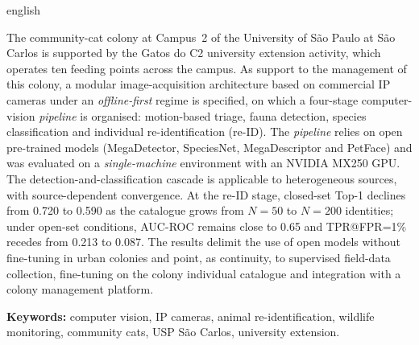 \begin{otherlanguage*}{english}
\renewcommand{\resumoname}{ABSTRACT}
\begin{resumoumacoluna}
The community-cat colony at Campus~2 of the University of São Paulo at São Carlos is supported by the Gatos do C2 university extension activity, which operates ten feeding points across the campus. As support to the management of this colony, a modular image-acquisition architecture based on commercial IP cameras under an \textit{offline-first} regime is specified, on which a four-stage computer-vision \textit{pipeline} is organised: motion-based triage, fauna detection, species classification and individual re-identification (re-ID). The \textit{pipeline} relies on open pre-trained models (MegaDetector, SpeciesNet, MegaDescriptor and PetFace) and was evaluated on a \textit{single-machine} environment with an NVIDIA MX250 GPU. The detection-and-classification cascade is applicable to heterogeneous sources, with source-dependent convergence. At the re-ID stage, closed-set Top-1 declines from 0.720 to 0.590 as the catalogue grows from $N{=}50$ to $N{=}200$ identities; under open-set conditions, AUC-ROC remains close to 0.65 and TPR@FPR=1\% recedes from 0.213 to 0.087. The results delimit the use of open models without fine-tuning in urban colonies and point, as continuity, to supervised field-data collection, fine-tuning on the colony individual catalogue and integration with a colony management platform.

\vspace{\onelineskip}
\noindent
\textbf{Keywords:} computer vision, IP cameras, animal re-identification, wildlife monitoring, community cats, USP São Carlos, university extension.
\end{resumoumacoluna}
\end{otherlanguage*}